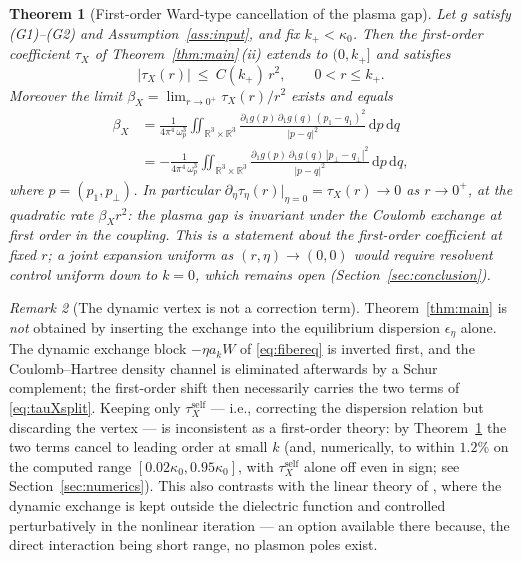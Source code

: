 \documentclass[11pt,a4paper]{amsart}
\newtheorem{theorem}{Theorem}[section]
\theoremstyle{definition}
\theoremstyle{remark}
\newtheorem{remark}[theorem]{Remark}
\newcommand{\R}{\mathbb{R}}
\newcommand{\dd}{\,\mathrm{d}}
\begin{document}
\begin{theorem}[First-order Ward-type cancellation of the plasma gap]\label{thm:ward}
Let $g$ satisfy \textup{(G1)--(G2)} and Assumption~\textup{\ref{ass:input}}, and fix $k_+<\kappa_0$. Then the first-order coefficient $\tau_X$ of Theorem~\textup{\ref{thm:main}\,(ii)} extends to $(0,k_+]$ and satisfies
\[
|\tau_X(r)|\ \le\ C(k_+)\,r^2,\qquad 0<r\le k_+ .
\]
Moreover the limit $\beta_X=\lim_{r\to0^+}\tau_X(r)/r^2$ exists and equals
\begin{equation}\label{eq:betaX}
\begin{split}
\beta_X&=\frac{1}{4\pi^4\,\omega_p^3}\iint_{\R^3\times\R^3}\frac{\partial_1g(p)\,\partial_1g(q)\,(p_1-q_1)^2}{|p-q|^2}\dd p\dd q\\
&=-\frac{1}{4\pi^4\,\omega_p^3}\iint_{\R^3\times\R^3}\frac{\partial_1g(p)\,\partial_1g(q)\,|p_\perp-q_\perp|^2}{|p-q|^2}\dd p\dd q,
\end{split}
\end{equation}
where $p=(p_1,p_\perp)$. In particular $\partial_\eta\tau_\eta(r)\big|_{\eta=0}=\tau_X(r)\to0$ as $r\to0^+$, at the quadratic rate $\beta_Xr^2$: the plasma gap is invariant under the Coulomb exchange at first order in the coupling. This is a statement about the first-order coefficient at fixed $r$; a joint expansion uniform as $(r,\eta)\to(0,0)$ would require resolvent control uniform down to $k=0$, which remains open \textup{(}Section~\ref{sec:conclusion}\textup{)}.
\end{theorem}

\begin{remark}[The dynamic vertex is not a correction term]\label{rem:meaning}
Theorem~\ref{thm:main} is \emph{not} obtained by inserting the exchange into the equilibrium dispersion $\epsilon_\eta$ alone. The dynamic exchange block $-\eta a_kW$ of \eqref{eq:fibereq} is inverted first, and the Coulomb--Hartree density channel is eliminated afterwards by a Schur complement; the first-order shift then necessarily carries the two terms of \eqref{eq:tauXsplit}. Keeping only $\tau_X^{\mathrm{self}}$ --- i.e., correcting the dispersion relation but discarding the vertex --- is inconsistent as a first-order theory: by Theorem~\ref{thm:ward} the two terms cancel to leading order at small $k$ (and, numerically, to within $1.2\%$ on the computed range $[0.02\kappa_0,0.95\kappa_0]$, with $\tau_X^{\mathrm{self}}$ alone off even in sign; see Section~\ref{sec:numerics}). This also contrasts with the linear theory of \cite{NY2}, where the dynamic exchange is kept outside the dielectric function and controlled perturbatively in the nonlinear iteration --- an option available there because, the direct interaction being short range, no plasmon poles exist.
\end{remark}
\end{document}
